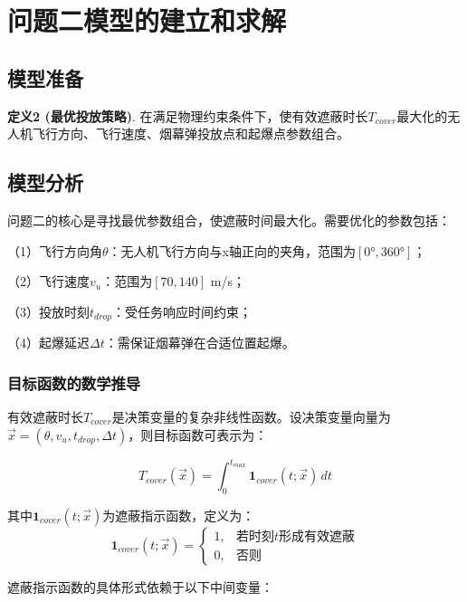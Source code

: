 \documentclass[12pt,a4paper]{article}
\begin{document}
\section{问题二模型的建立和求解}

\subsection{模型准备}

\noindent\textbf{定义2 (最优投放策略)}. 在满足物理约束条件下，使有效遮蔽时长$T_{cover}$最大化的无人机飞行方向、飞行速度、烟幕弹投放点和起爆点参数组合。

\subsection{模型分析}

\indent 问题二的核心是寻找最优参数组合，使遮蔽时间最大化。需要优化的参数包括：

\indent （1）飞行方向角$\theta$：无人机飞行方向与x轴正向的夹角，范围为$[0°, 360°]$；

\indent （2）飞行速度$v_u$：范围为$[70, 140]$ m/s；

\indent （3）投放时刻$t_{drop}$：受任务响应时间约束；

\indent （4）起爆延迟$\Delta t$：需保证烟幕弹在合适位置起爆。

\subsubsection{目标函数的数学推导}

\indent 有效遮蔽时长$T_{cover}$是决策变量的复杂非线性函数。设决策变量向量为$\vec{x} = (\theta, v_u, t_{drop}, \Delta t)$，则目标函数可表示为：

\begin{equation}
T_{cover}(\vec{x}) = \int_0^{t_{max}} \mathbf{1}_{cover}(t; \vec{x}) \, dt
\end{equation}

\indent 其中$\mathbf{1}_{cover}(t; \vec{x})$为遮蔽指示函数，定义为：
\begin{equation}
\mathbf{1}_{cover}(t; \vec{x}) = 
\begin{cases}
1, & \text{若时刻}t\text{形成有效遮蔽} \\
0, & \text{否则}
\end{cases}
\end{equation}

\indent 遮蔽指示函数的具体形式依赖于以下中间变量：
\end{document}
